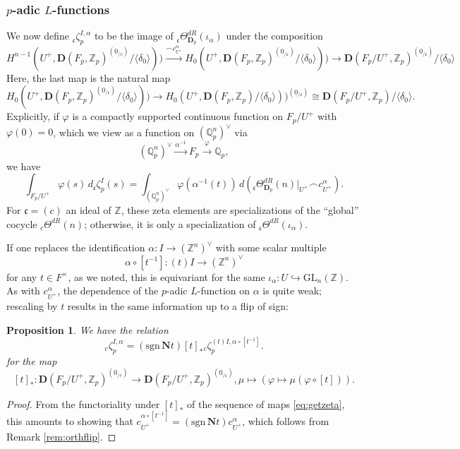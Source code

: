 \documentclass[10pt]{amsart}
\newtheorem{prop}[thm]{Proposition}
\theoremstyle{definition}
\newcommand{\Z}{\mathbb{Z}}
\newcommand{\Q}{\mathbb{Q}}
\renewcommand{\c}{\mathfrak{c}}
\newcommand{\D}{\mathbf{D}}
\newcommand{\sgn}{\mathrm{sgn}}
\newcommand{\GL}{\mathrm{GL}}
\numberwithin{equation}{section}
\begin{document}
    \subsubsection{$p$-adic $L$-functions} \label{section:padic}
    
    We now define ${}_\c\zeta_p^{I,\alpha}$ to be the image of ${}_\c\Theta^{dR}_{\D_p}(\iota_\alpha)$ under the composition
    \begin{equation} \label{eq:getzeta}
        H^{n-1}(U^+, \D(F_p, \Z_p)^{(0_{/c})}/\langle \delta_0\rangle)) \xrightarrow{\frown c_{U^+}^\alpha} H_0(U^+, \D(F_p, \Z_p)^{(0_{/\c})}/\langle \delta_0\rangle))\to \D(F_p/U^+, \Z_p)^{(0_{/\c})}/\langle \delta_0\rangle 
    \end{equation}
    Here, the last map is the natural map
    \[
        H_0(U^+, \D(F_p, \Z_p)^{(0_{/\c})}/\langle \delta_0\rangle)) \to H_0(U^+, \D(F_p, \Z_p)/\langle \delta_0\rangle))^{(0_{/\c})} \cong \D(F_p/U^+, \Z_p)/\langle \delta_0\rangle.
    \]
    Explicitly, if $\varphi$ is a compactly supported continuous function on $F_p/U^+$ with $\varphi(0)=0$, which we view as a function on $(\Q_p^n)^\vee$ via 
    \[
    (\Q_p^n)^\vee\xrightarrow{\alpha^{-1}}F_p\xrightarrow{\varphi} \Q_p,
    \]
    we have
    \begin{equation} \label{eq:getzeta2}
    \int_{F_p/U^+}\varphi(s)\, d{}_\c\zeta_p^{I}(s) = \int_{(\Q_p^n)^\vee} \varphi(\alpha^{-1}(t))\, d({}_\c\Theta^{dR}_{\D_p}(n)|_{U^+} \frown c_{U^+}^\alpha). 
    \end{equation}
    For $\c=(c)$ an ideal of $\Z$, these zeta elements are specializations of the ``global'' cocycle ${}_c\Theta^{dR}(n)$; otherwise, it is only a specialization of ${}_\c\Theta^{dR}(\iota_\alpha)$.

    If one replaces the identification $\alpha:I\to (\mathbb{Z}^n)^\vee$ with some scalar multiple
        \[
            \alpha \circ [t^{-1}]: (t)I \to (\mathbb{Z}^n)^\vee
        \]
    for any $t\in F^\times$, as we noted, this is equivariant for the same $\iota_{\alpha}:U \hookrightarrow \GL_n(\Z)$. As with $c^{\alpha}_{U^+}$, the dependence of the $p$-adic $L$-function on $\alpha$ is quite weak; rescaling by $t$ results in the same information up to a flip of sign:

    \begin{prop} \label{prop:signkey}
    We have the relation
        \begin{equation} \label{eq:scaleideal}
        {}_c\zeta^{I,\alpha}_p = (\sgn\, \mathbf{N}t)[t]_*{}_c\zeta^{(t)I, \alpha \circ [t^{-1}]}_p.
        \end{equation}
        for the map
        \[
            [t]_*: \D(F_p/U^+, \Z_p)^{(0_{/c})}\to \D(F_p/U^+, \Z_p)^{(0_{/\c})}, \mu\mapsto (\varphi \mapsto \mu(\varphi \circ [t])).
        \]
    \end{prop}
    \begin{proof}
        From the functoriality under $[t]_*$ of the sequence of maps \eqref{eq:getzeta}, this amounts to showing that $c_{U^+}^{\alpha\circ [t^{-1}]} = (\sgn\, \mathbf{N}t) c_{U^+}^\alpha$, which follows from Remark \ref{rem:orthflip}. 
    \end{proof}
\end{document}
